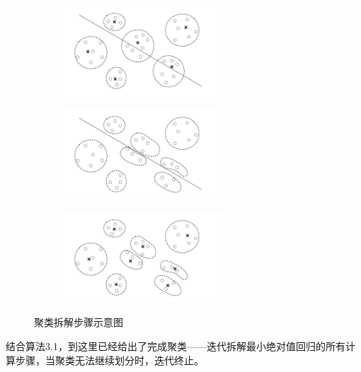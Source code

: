\begin{figure}[H]
    \centering
    \begin{subfigure}[t]{0.3\textwidth}\label{aid-demo1}
    \includegraphics[width=6cm]{pics/chapter2/aid-demo-a.pdf}
    \end{subfigure}
    \begin{subfigure}[t]{0.3\textwidth}\label{aid-demo2}
    \includegraphics[width=6cm]{pics/chapter2/aid-demo-b.pdf}
    \end{subfigure}
    \begin{subfigure}[t]{0.3\textwidth}\label{aid-demo3}
    \includegraphics[width=6cm]{pics/chapter2/aid-demo-c.pdf}
    \end{subfigure}
    \caption{\small 聚类拆解步骤示意图}
    \label{aid-demo}

\end{figure}

结合算法3.1，到这里已经给出了完成聚类——迭代拆解最小绝对值回归的所有计算步骤，当聚类无法继续划分时，迭代终止。

